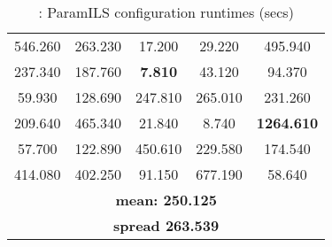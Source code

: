 \begin{table}[h]
\centering
\renewcommand{\arraystretch}{1.2}
\begin{tabular}{|ccccc|}
	\hline
	546.260 & 263.230 & 17.200 & 29.220 & 495.940 \\ 
	237.340 & 187.760 & \textcolor{naranja}{\bf 7.810} & 43.120 & 94.370 \\  
	\hline 
	59.930 & 128.690 & 247.810 & 265.010 & 231.260 \\ 
	209.640 & 465.340 & 21.840 & 8.740 & \textcolor{intenso}{\bf 1264.610} \\  
	\hline 
	57.700 & 122.890 & 450.610 & 229.580 & 174.540 \\ 
	414.080 & 402.250 & 91.150 & 677.190 & 58.640 \\  
	\hline 
	\multicolumn{5}{|c|}{\bf mean: 250.125}\\
	\multicolumn{5}{|c|}{\bf spread 263.539}\\
	\hline
\end{tabular}
\caption{\CARRP: ParamILS configuration runtimes (secs)}\label{table:testcagood}
\end{table}    
%
%
%
%
%
%

